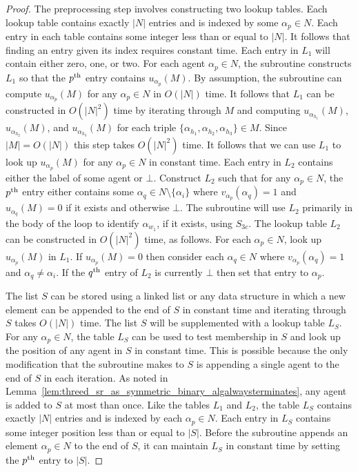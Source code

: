 \begin{proof}
The preprocessing step involves constructing two lookup tables. Each lookup table contains exactly $|N|$ entries and is indexed by some $\alpha_{p}\in N$. Each entry in each table contains some integer less than or equal to $|N|$. It follows that finding an entry given its index requires constant time.  
Each entry in $L_1$ will contain either zero, one, or two. For each agent $\alpha_{p}\in N$, the subroutine constructs $L_1$ so that the ${p}\textsuperscript{th}$ entry contains $u_{\alpha_p}(M)$. By assumption, the subroutine can compute $u_{\alpha_p}(M)$ for any $\alpha_p\in N$ in $O(|N|)$ time. It follows that $L_1$ can be constructed in $O(|N|^2)$ time by iterating through $M$ and computing $u_{\alpha_{h_1}}(M)$, $u_{\alpha_{h_2}}(M)$, and $u_{\alpha_{h_3}}(M)$ for each triple $\{ \alpha_{h_1}, \alpha_{h_2}, \alpha_{h_3} \} \in M$. Since $|M|=O(|N|)$ this step takes $O(|N|^2)$ time. It follows that we can use $L_1$ to look up $u_{\alpha_{p}}(M)$ for any $\alpha_{p}\in N$ in constant time. Each entry in $L_2$ contains either the label of some agent or $\bot$. Construct $L_2$ such that for any $\alpha_p\in N$, the ${p}\textsuperscript{th}$ entry either contains some $\alpha_{q}\in N \setminus \{ \alpha_i \}$ where $v_{\alpha_{p}}(\alpha_{q})=1$ and $u_{\alpha_{q}}(M)=0$ if it exists and otherwise $\bot$. The subroutine will use $L_2$ primarily in the body of the loop to identify $\alpha_{w_1}$, if it exists, using $S_{3c}$. The lookup table $L_2$ can be constructed in $O(|N|^2)$ time, as follows. For each $\alpha_{p}\in N$, look up $u_{\alpha_{p}}(M)$ in $L_1$. If $u_{\alpha_{p}}(M)=0$ then consider each $\alpha_{q}\in N$ where $v_{\alpha_{p}}(\alpha_{q})=1$ and $\alpha_{q}\neq \alpha_i$. If the $q\textsuperscript{th}$ entry of $L_2$ is currently $\bot$ then set that entry to $\alpha_{p}$.

The list $S$ can be stored using a linked list or any data structure in which a new element can be appended to the end of $S$ in constant time and iterating through $S$ takes $O(|N|)$ time. The list $S$ will be supplemented with a lookup table $L_S$. For any $\alpha_p \in N$, the table $L_S$ can be used to test membership in $S$ and look up the position of any agent in $S$ in constant time. This is possible because the only modification that the subroutine makes to $S$ is appending a single agent to the end of $S$ in each iteration. As noted in Lemma~\ref{lem:threed_sr_as_symmetric_binary_algalwaysterminates}, any agent is added to $S$ at most than once. Like the tables $L_1$ and $L_2$, the table $L_S$ contains exactly $|N|$ entries and is indexed by each $\alpha_{p}\in N$. Each entry in $L_S$ contains some integer position less than or equal to $|S|$. Before the subroutine appends an element $\alpha_p\in N$ to the end of $S$, it can maintain $L_S$ in constant time by setting the $p\textsuperscript{th}$ entry to $|S|$.


\end{proof}
